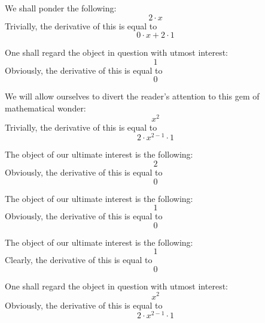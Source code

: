\documentclass{article}
\begin{document}
We shall ponder the following:
\begin{equation}
2 \cdot x 
\end{equation}
Trivially, the derivative of this is equal to
\begin{equation}
0 \cdot x + 2 \cdot 1 
\end{equation}

One shall regard the object in question with utmost interest:
\begin{equation}
1 
\end{equation}
Obviously, the derivative of this is equal to
\begin{equation}
0 
\end{equation}

We will allow ourselves to divert the reader's attention to this gem of mathematical wonder:
\begin{equation}
x ^{2 } 
\end{equation}
Trivially, the derivative of this is equal to
\begin{equation}
2 \cdot x ^{2 - 1 } \cdot 1 
\end{equation}

The object of our ultimate interest is the following:
\begin{equation}
2 
\end{equation}
Obviously, the derivative of this is equal to
\begin{equation}
0 
\end{equation}

The object of our ultimate interest is the following:
\begin{equation}
1 
\end{equation}
Obviously, the derivative of this is equal to
\begin{equation}
0 
\end{equation}

The object of our ultimate interest is the following:
\begin{equation}
1 
\end{equation}
Clearly, the derivative of this is equal to
\begin{equation}
0 
\end{equation}

One shall regard the object in question with utmost interest:
\begin{equation}
x ^{2 } 
\end{equation}
Obviously, the derivative of this is equal to
\begin{equation}
2 \cdot x ^{2 - 1 } \cdot 1 
\end{equation}
\end{document}
